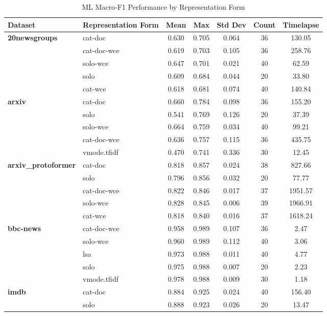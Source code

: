 \documentclass[final]{clv2025-revised}
\begin{document}
\begin{table}[h!]
\centering
\scriptsize
\caption{ML Macro-F1 Performance by Representation Form}
\label{tab:macro_f1_repr_form}
\begin{tabular}{@{}p{2.2cm} p{2.6cm} c c c c c@{}}
\toprule
\textbf{Dataset} & \textbf{Representation Form} & \textbf{Mean} & \textbf{Max} & \textbf{Std Dev} & \textbf{Count} & \textbf{Timelapse} \\
\midrule
\textbf{20newsgroups} & cat-doc & 0.630 & 0.705 & 0.064 & 36 & 130.05 \\
 & cat-doc-wce & 0.619 & 0.703 & 0.105 & 36 & 258.76 \\
 & solo-wce & 0.647 & 0.701 & 0.021 & 40 & 62.59 \\
 & solo & 0.609 & 0.684 & 0.044 & 20 & 33.80 \\
 & cat-wce & 0.618 & 0.681 & 0.074 & 40 & 140.84 \\
\midrule
\textbf{arxiv} & cat-doc & 0.660 & 0.784 & 0.098 & 36 & 155.20 \\
 & solo & 0.541 & 0.769 & 0.126 & 20 & 37.39 \\
 & solo-wce & 0.664 & 0.759 & 0.034 & 40 & 99.21 \\
 & cat-doc-wce & 0.636 & 0.757 & 0.115 & 36 & 435.75 \\
 & vmode.tfidf & 0.470 & 0.741 & 0.336 & 30 & 12.45 \\
\midrule
\textbf{arxiv\_protoformer} & cat-doc & 0.818 & 0.857 & 0.024 & 38 & 827.66 \\
 & solo & 0.796 & 0.856 & 0.032 & 20 & 77.77 \\
 & cat-doc-wce & 0.822 & 0.846 & 0.017 & 37 & 1951.57 \\
 & solo-wce & 0.828 & 0.845 & 0.006 & 39 & 1966.91 \\
 & cat-wce & 0.818 & 0.840 & 0.016 & 37 & 1618.24 \\
\midrule
\textbf{bbc-news} & cat-doc-wce & 0.958 & 0.989 & 0.107 & 36 & 2.47 \\
 & solo-wce & 0.960 & 0.989 & 0.112 & 40 & 3.06 \\
 & lsa & 0.973 & 0.988 & 0.011 & 40 & 4.77 \\
 & solo & 0.975 & 0.988 & 0.007 & 20 & 2.23 \\
 & vmode.tfidf & 0.978 & 0.988 & 0.009 & 30 & 1.18 \\
\midrule
\textbf{imdb} & cat-doc & 0.884 & 0.925 & 0.024 & 40 & 156.40 \\
 & solo & 0.888 & 0.923 & 0.026 & 20 & 13.47 \\

\end{tabular}
\end{table}
\end{document}

